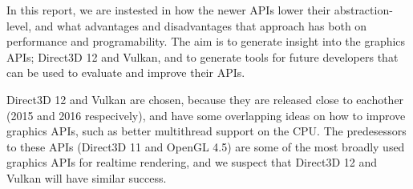 In this report, we are instested in how the newer \glspl{API} lower their abstraction-level, and what advantages and disadvantages that approach has both on performance and programability.
The aim is to generate insight into the graphics \glspl{API}; Direct3D 12 and Vulkan, and to generate tools for future developers that can be used to evaluate and improve their \glspl{API}.

Direct3D 12 and Vulkan are chosen, because they are released close to eachother (2015 and 2016 respecively), and have some overlapping ideas on how to improve graphics \glspl{API}, such as better multithread support on the CPU.
The predesessors to these \glspl{API} (Direct3D 11 and OpenGL 4.5) are some of the most broadly used graphics \glspl{API} for realtime rendering, and we suspect that Direct3D 12 and Vulkan will have similar success.







